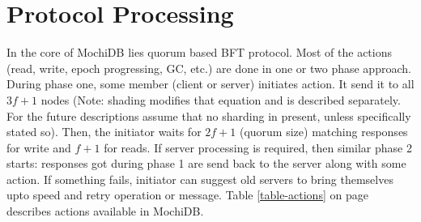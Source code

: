 \documentclass[letterpaper,twocolumn,10pt]{article}
\begin{document}
\section{Protocol Processing}
In the core of MochiDB lies quorum based BFT protocol. Most of the actions (read, write, epoch progressing, GC, etc.) are done in one or two phase approach. During phase one, some member (client or server) initiates action. It send it to all $3f+1$ nodes (Note: shading modifies that equation and is described separately. For the future descriptions assume that no sharding in present, unless specifically stated so). Then, the initiator waits for $2f+1$ (quorum size) matching responses for write and $f+1$ for reads. If server processing is required, then similar phase 2 starts: responses got during phase 1 are send back to the server along with some action. If something fails, initiator can suggest old servers to bring themselves upto speed and retry operation or message. Table \ref{table-actions} on page \pageref{table-actions} describes actions available in MochiDB.

\begin{table}[]
\centering
\caption{MochiDB actions}
\label{table-actions}
\end{table}
\end{document}
